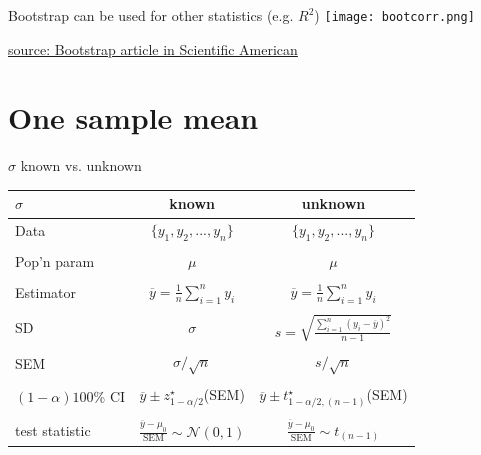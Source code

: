 \documentclass[10pt,handout]{beamer}\usepackage[]{graphicx}\usepackage[]{color}
\begin{document}
\begin{frame}{Bootstrap can be used for other statistics (e.g. $R^2$)}
	\centering
	\texttt{[image: bootcorr.png]}
	
	\vspace{0.1in}
	
	\tiny \href{https://www.dropbox.com/s/cxiq70zxxtyxlb5/EfronDiaconisBootstrap.pdf?dl=0}{source: Bootstrap article in Scientific American}
\end{frame}


\section{One sample mean}


\begin{frame}{$\sigma$ known vs. unknown}
	\begin{center}
		\begin{tabular}{|l|c|c|} \hline
			$\sigma$& known & unknown \\ \hline Data & $\{y_1,y_2,...,y_n\}$ &
			$\{y_1,y_2,...,y_n\}$\\
			& & \\
			Pop'n param & $\mu$ & $\mu$\\
			& & \\
			Estimator & $\overline{y} = \frac{1}{n}\sum_{i=1}^n y_i$ & $\overline{y} = \frac{1}{n}\sum_{i=1}^n y_i$ \\
			& & \\
			SD & $\sigma$ & $s = \sqrt{\frac{\sum_{i=1}^n(y_i-\overline{y})^2}{n-1}}$ \\
			& & \\
			SEM & $\sigma/\sqrt{n}$ & $s / \sqrt{n}$ \\
			& & \\
			$(1-\alpha)100$\% CI & $\overline{y} \pm z^\star_{1-\alpha/2}$(SEM) & $\overline{y} \pm t^\star_{1-\alpha/2, (n-1)}$(SEM) \\
			& & \\
			test statistic & $\frac{\overline{y}-\mu_0}{\textrm{SEM}}\sim \mathcal{N}(0,1)$ &
			$\frac{\overline{y}-\mu_0}{\textrm{SEM}}\sim t_{(n-1)}$ \\
			\hline
		\end{tabular}
	\end{center}
\end{frame}
\end{document}
